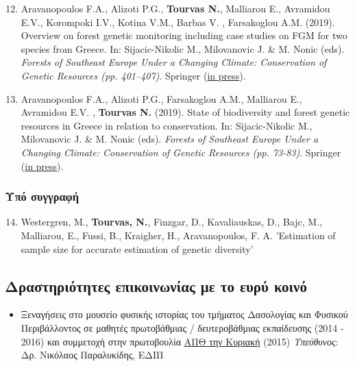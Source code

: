 \documentclass[12pt,]{scrartcl}
\begin{document}
\begin{enumerate}
	\setcounter{enumi}{11}
\leftskip-0.07in
\vspace{-3mm}

\item Aravanopoulos F.A., Alizoti P.G., \textbf{Tourvas N.}, Malliarou E., Avramidou E.V., Korompoki I.V., Kotina V.M., Barbas V. ,  Farsakoglou A.M. (2019). Overview on forest genetic monitoring including case studies on FGM for two species from Greece. In: Sijacic-Nikolic M., Milovanovic J. & M. Nonic (eds). \textit{Forests of Southeast Europe Under a Changing Climate: Conservation of Genetic Resources (pp. 401–407)}. Springer (\href{https://www.springer.com/us/book/9783319952666}{in press}).


\item Aravanopoulos F.A., Alizoti P.G., Farsakoglou A.M., Malliarou E., Avramidou E.V. , \textbf{Tourvas N.}  (2019). State of biodiversity and forest genetic resources in Greece in relation to conservation. In: Sijacic-Nikolic M., Milovanovic J. & M. Nonic (eds). \textit{Forests of Southeast Europe Under a Changing Climate: Conservation of Genetic Resources (pp. 73-83)}. Springer (\href{https://www.springer.com/us/book/9783319952666}{in press}). 

\end{enumerate}

\subsubsection{Υπό συγγραφή}\label{book-chapters}

\begin{enumerate}
	\setcounter{enumi}{13}
\leftskip-0.07in
\vspace{-3mm}

\item Westergren, M., \textbf{Tourvas, N.}, Finzgar, D., Kavaliauskas, D., Bajc, M., Malliarou, E., Fussi, B., Kraigher, H., Aravanopoulos, F. A. 'Estimation of sample size for accurate estimation of genetic diversity'

\end{enumerate}

\subsection{Δραστηριότητες επικοινωνίας με το ευρύ κοινό}\label{public_outreach}
\begin{itemize}
\vspace{-3mm}
\setlength\itemsep{-0.6em}
\item Ξεναγήσεις στο μουσείο φυσικής ιστορίας του τμήματος Δασολογίας και Φυσικού Περιβάλλοντος σε μαθητές πρωτοβάθμιας / δευτεροβάθμιας εκπαίδευσης (2014 - 2016) και συμμετοχή στην πρωτοβουλία \href{https://www.auth.gr/sites/default/files/web_final.pdf}{ΑΠΘ την Κυριακή} (2015)
\vspace{2mm}
\newline
\textit{Υπεύθυνος}: Δρ. Νικόλαος Παραλυκίδης, ΕΔΙΠ
\end{itemize}




\end{document}
